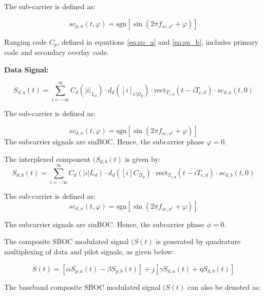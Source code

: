\noindent The sub-carrier is defined as:

\begin{equation}
sc_{p,x}(t, \varphi) = \text{sgn}[\sin(2\pi f_{sc,x^t} + \varphi)]
\label{eq:sub_carrier}
\end{equation}

\noindent Ranging code $C_p$, defined in equations \eqref{eq:sp_a} and \eqref{eq:sp_b}, includes primary code and secondary overlay code.


\textbf{Data Signal:}

\begin{equation}
S_{d,a}(t) = \sum_{i=-\infty}^{\infty} C_d(|i|_{L_d}  ) \cdot d_d([i]_{CD_d}) \cdot \text{rect} _{T_{c,d}} \left({t - iT_{c,d}}\right) \cdot sc_{d,a}(t, 0)
\label{eq:signal_da}
\end{equation}

\noindent The sub-carrier is defined as:

\begin{equation}
sc_{d,x}(t, \varphi) = \text{sgn}[\sin(2\pi f_{sc,x^t} + \varphi)]
\label{eq:subcarrier_dc_x}
\end{equation}
\noindent The subcarrier signals are sinBOC. Hence, the subcarrier phase $\varphi=0$.

\noindent The interplexed component $(S_{d,b}(t)$ is given by:
\begin{equation}
S_{d,b}(t) = \sum_{i=-\infty}^{\infty} C_d(|i|L_d) \cdot d_d([i]C_{D_d}) \cdot \text{rect}_{T_{c,d}} \left( t - iT_{c,d} \right) \cdot sc_{d,b}(t, 0)
\label{eq:interplexed_component}
\end{equation}

\noindent The sub-carrier is defined as:
\begin{equation}
sc_{d,x}(t, \varphi) = \text{sgn}[\sin(2\pi f_{sc,x^t} + \varphi)]
\label{eq:subcarrier_dc}
\end{equation}

\noindent The subcarrier signals are sinBOC. Hence, the subcarrier phase $\phi=0$.

\noindent The composite SBOC modulated signal $(S(t)$ is generated by quadrature multiplexing of data and pilot signals, as given below:

\begin{equation}
S(t) = [\alpha S_{p,a}(t) - \beta S_{p,b}(t)] + j[\gamma S_{d,a}(t) + \eta S_{d,b}(t)]
\label{eq:composite_signal}
\end{equation}

\noindent The baseband composite SBOC modulated signal $(S(t)$ can also be denoted as:

